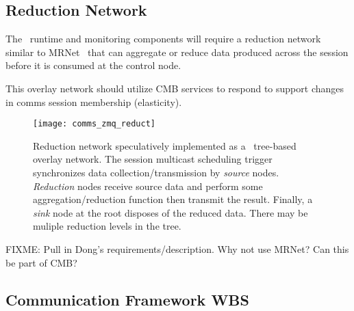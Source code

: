 \subsection{Reduction Network}

The \ngrm\ runtime and monitoring components will require a
reduction network similar to MRNet~\cite{MRNet} that
can aggregate or reduce data produced across the session before it is
consumed at the control node.

This overlay network should utilize CMB services to respond to support changes
in comms session membership (elasticity).

\begin{figure}
\centering
\texttt{[image: comms\_zmq\_reduct]}
\caption{Reduction network speculatively implemented as a \zMQ\ tree-based
overlay network.  The session multicast scheduling trigger synchronizes
data collection/transmission by {\em source} nodes.  {\em Reduction} nodes
receive source data and perform some aggregation/reduction function
then transmit the result.  Finally, a {\em sink} node at the root
disposes of the reduced data.
There may be muliple reduction levels in the tree.}
\label{FigZmqTBON}
\end{figure}


FIXME: Pull in Dong's requirements/description.
Why not use MRNet?
Can this be part of CMB?

\ifwbs
\newpage
\subsection{Communication Framework WBS}\label{CommsFrameworkWBS}


